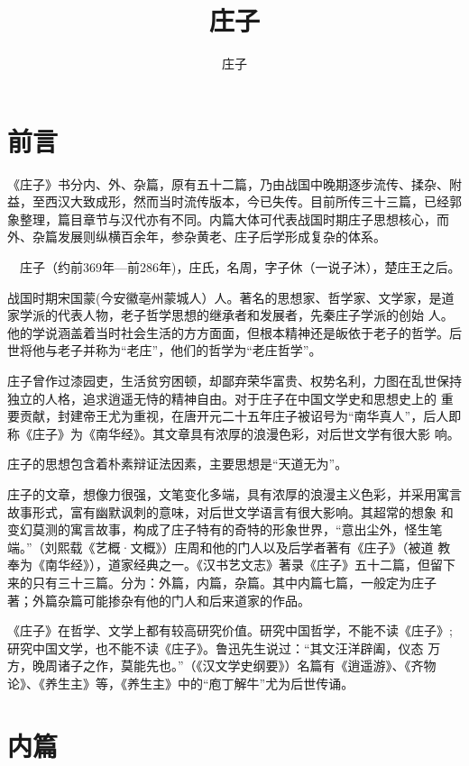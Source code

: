 \documentclass[a4paper,12pt,UTF8,twoside]{ctexbook}
\title{\heiti\zihao{0} 庄子}
\author{庄子}
\date{}
\begin{document}
\maketitle
\tableofcontents

\frontmatter
\chapter{前言}
《庄子》书分内、外、杂篇，原有五十二篇，乃由战国中晚期逐步流传、揉杂、附益，至西汉大致成形，然而当时流传版本，今已失传。目前所传三十三篇，已经郭象整理，篇目章节与汉代亦有不同。内篇大体可代表战国时期庄子思想核心，而外、杂篇发展则纵横百余年，参杂黄老、庄子后学形成复杂的体系。

　庄子（约前369年—前286年)，庄氏，名周，字子休（一说子沐），楚庄王之后。

战国时期宋国蒙(今安徽亳州蒙城人）人。著名的思想家、哲学家、文学家，是道家学派的代表人物，老子哲学思想的继承者和发展者，先秦庄子学派的创始 人。他的学说涵盖着当时社会生活的方方面面，但根本精神还是皈依于老子的哲学。后世将他与老子并称为“老庄”，他们的哲学为“老庄哲学”。

庄子曾作过漆园吏，生活贫穷困顿，却鄙弃荣华富贵、权势名利，力图在乱世保持独立的人格，追求逍遥无恃的精神自由。对于庄子在中国文学史和思想史上的 重要贡献，封建帝王尤为重视，在唐开元二十五年庄子被诏号为“南华真人”，后人即称《庄子》为《南华经》。其文章具有浓厚的浪漫色彩，对后世文学有很大影 响。

庄子的思想包含着朴素辩证法因素，主要思想是“天道无为”。

庄子的文章，想像力很强，文笔变化多端，具有浓厚的浪漫主义色彩，并采用寓言故事形式，富有幽默讽刺的意味，对后世文学语言有很大影响。其超常的想象 和变幻莫测的寓言故事，构成了庄子特有的奇特的形象世界，“意出尘外，怪生笔端。”（刘熙载《艺概·文概》）庄周和他的门人以及后学者著有《庄子》（被道 教奉为《南华经》），道家经典之一。《汉书艺文志》著录《庄子》五十二篇，但留下来的只有三十三篇。分为：外篇，内篇，杂篇。其中内篇七篇，一般定为庄子 著；外篇杂篇可能掺杂有他的门人和后来道家的作品。

《庄子》在哲学、文学上都有较高研究价值。研究中国哲学，不能不读《庄子》;研究中国文学，也不能不读《庄子》。鲁迅先生说过：“其文汪洋辟阖，仪态 万方，晚周诸子之作，莫能先也。”（《汉文学史纲要》）名篇有《逍遥游》、《齐物论》、《养生主》等，《养生主》中的“庖丁解牛”尤为后世传诵。 

\mainmatter

\chapter{内篇}
\end{document}
